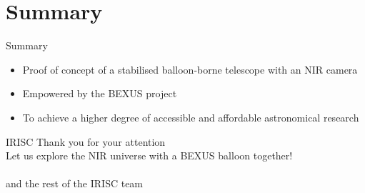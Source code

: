 \documentclass[11pt, aspectratio=169]{beamer}
\begin{document}
\section{Summary}
\begin{frame}[t]{Summary} 		%
\centering
\begin{itemize}
    \item Proof of concept of a stabilised balloon-borne telescope with an NIR camera
    \item Empowered by the BEXUS project
    \item To achieve a higher degree of accessible and affordable astronomical research
\end{itemize}

\begin{figure}
    \vspace{-.3cm}
     \hspace{2cm}
\end{figure}
\end{frame}

\begin{frame}{IRISC}
    \centering
    \Huge Thank you for your attention\\\vspace{.3cm}
    \Large Let us explore the NIR universe with a BEXUS balloon together!\\
    
    \vspace{1cm}
    \large \insertauthor \\\vspace{.2cm}%
    and the rest of the IRISC team
\end{frame}
\end{document}
